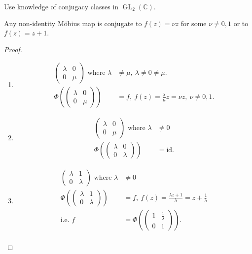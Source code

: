 Use knowledge of conjugacy classes in $\operatorname{GL}_2(\mathbb{C})$.

\begin{theorem} \label{thm:17}
    Any non-identity M\"obius map is conjugate to $f(z) = \nu z$ for some $\nu \neq 0, 1$ or to $f(z) = z + 1$.
\end{theorem} 

\begin{proof} ~
    \begin{enumerate}
        \item
        \begin{align*}
            \begin{pmatrix}\lambda & 0 \\0 & \mu\end{pmatrix} \text{ where } \lambda &\neq \mu,\ \lambda \neq 0 \neq \mu. \\
            \Phi \left( \begin{pmatrix}\lambda & 0 \\0 & \mu\end{pmatrix} \right) &= f,\ f(z) = \frac{\lambda}{\mu} z = \nu z,\ \nu \neq 0, 1.
        \end{align*}
        \item
        \begin{align*}
            \begin{pmatrix}\lambda & 0 \\0 & \mu\end{pmatrix} \text{ where } \lambda &\neq 0 \\
            \Phi \left( \begin{pmatrix}\lambda & 0 \\0 & \lambda \end{pmatrix} \right) &= \text{id}.
        \end{align*}
        \item \begin{align*}
            \begin{pmatrix}\lambda & 1 \\0 & \lambda\end{pmatrix} \text{ where } \lambda &\neq 0 \\
            \Phi \left( \begin{pmatrix}\lambda & 1 \\0 & \lambda \end{pmatrix} \right) &= f,\ f(z) = \frac{\lambda z + 1}{\lambda} = z + \frac{1}{\lambda} \\
            \text{i.e. } f &= \Phi \left( \begin{pmatrix}1 & \frac{1}{\lambda} \\0 & 1\end{pmatrix} \right). \\

\end{align*}
\end{enumerate}
\end{proof}
